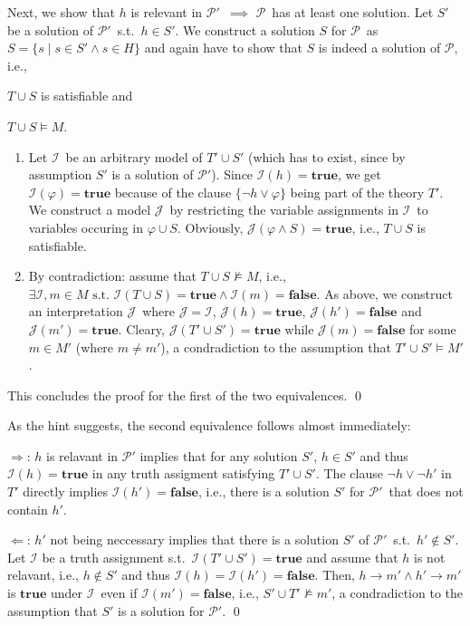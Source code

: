 \documentclass [11pt]{article}
\renewcommand{\phi}{\varphi}
\newcommand{\True}{\mathbf{true}}
\newcommand{\False}{\mathbf{false}}
\newcommand{\pap}{\ensuremath{\mathcal{P}}}
\newcommand{\papp}{\ensuremath{\mathcal{P'}}}
\newcommand{\mI}{\ensuremath{\mathcal{I}}}
\newcommand{\mJ}{\ensuremath{\mathcal{J}}}
\begin{document}
\medskip
Next, we show that $h$ is relevant in \papp\ $\implies$ \pap\ has at least one solution.
Let $S'$ be a solution of \papp\ s.t.\ $h\in S'$.
We construct a solution $S$ for \pap\ as $S = \{s \mid s \in S' \land s \in H \}$ and again have to show that  $S$ is indeed a solution of \pap, i.e., 
\begin{inparaenum}
 \item $T \cup S$ is satisfiable and
 \item $T \cup S \models M$.
\end{inparaenum}
\begin{enumerate}
 \item Let \mI\ be an arbitrary model of $T' \cup S'$ (which has to exist, since by assumption $S'$ is a solution of \papp).
 Since $\mI(h) = \True$, we get $\mI(\phi) = \True$ because of the clause $\{\neg h \lor \phi\}$ being part of the theory $T'$.
 We construct a model \mJ\ by restricting the variable assignments in \mI\ to variables occuring in $\phi \cup S$.
 Obviously, $\mJ(\phi \land S) = \True$, i.e., $T\cup S$ is satisfiable.
 \item By contradiction: assume that $T \cup S \not \models M$, i.e., $\exists \mI, m\in M \text{ s.t. } \mI(T \cup S) = \True \land \mI(m) = \False$.
 As above, we construct an interpretation \mJ\, where $\mJ = \mI$, $\mJ(h) = \True$, $\mJ(h') = \False$ and $\mJ(m') = \True$.
 Cleary, $\mJ(T'\cup S') = \True$ while $\mJ(m) = \False$ for some $m \in M'$ (where $m \neq m'$), a condradiction to the assumption that $T' \cup S' \models M'$.
\end{enumerate}
This concludes the proof for the first of the two equivalences. 
\qed

As the hint suggests, the second equivalence follows almost immediately:

$\Rightarrow$: $h$ is relavant in $\papp$ implies that for any solution $S'$, $h \in S'$ and thus $\mI(h) = \True$ in any truth assigment satisfying $T' \cup S'$. 
The clause $\neg h \lor \neg h'$ in $T'$ directly implies $\mI(h') = \False$, i.e., there is a solution $S'$ for \papp\ that does not contain $h'$.
 
$\Leftarrow$: $h'$ not being neccessary implies that there is a solution $S'$ of \papp\ s.t.\ $h' \not \in S'$. 
Let $\mI$ be a truth assignment s.t.\ $\mI(T' \cup S') = \True$ and assume that $h$ is not relavant, i.e., $h \not \in S'$ and thus $\mI(h) = \mI(h') = \False$. 
Then, $h \rightarrow m' \land h' \rightarrow m'$ is $\True$ under \mI\ even if $\mI(m') = \False$, i.e., $S' \cup T' \not \models m'$, a condradiction to the assumption that $S'$ is a solution for \papp.
\qed
\end{document}
